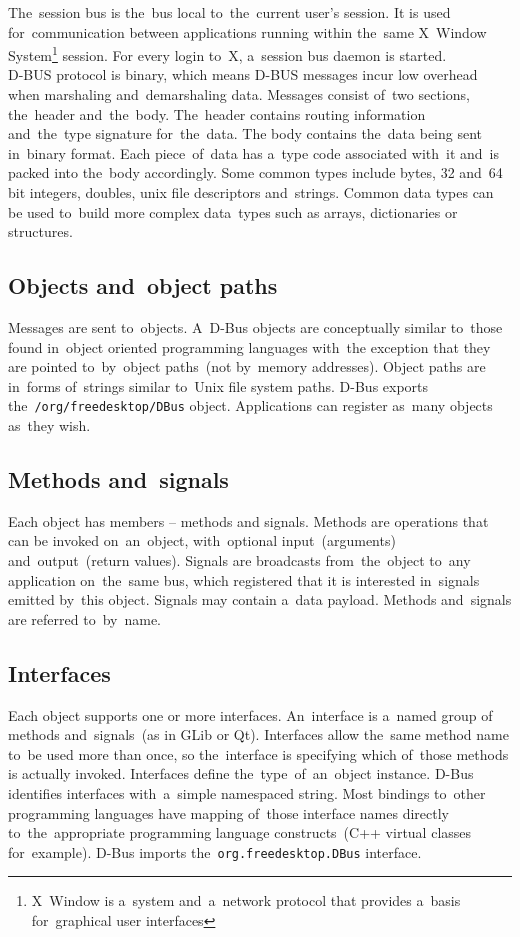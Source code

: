The~session bus is the~bus local to~the~current user's session. It is used
for~communication between applications running within the~same X~Window System\footnote{X~Window is a~system and~a~network protocol that provides a~basis
for~graphical user interfaces} session. For every login to~X, a~session bus
daemon is started.\\

D-BUS protocol is binary, which means D-BUS messages incur low overhead when
marshaling and~demarshaling data. Messages consist of~two sections, the~header
and~the~body. The~header contains routing information and~the~type signature
for~the~data. The body contains the~data being sent in~binary format. Each
piece~of~data has a~type code \mbox{associated} with~it and~is packed into the~body
accordingly. Some common types include bytes, 32 and~64 bit integers, doubles,
unix file descriptors and~strings. Common data types can be used to~build more
complex data~types such as arrays, dictionaries or structures.

\subsection{Objects and~object paths}
Messages are sent to~objects. A~D-Bus objects are conceptually similar to~those
found in~object oriented programming languages with~the exception that they are
pointed to~by~object paths~(not by~memory addresses). Object paths are in~forms
of~strings similar to~Unix file system paths. D-Bus exports
the~\texttt{/org/freedesktop/DBus} object. Applications can register as~many
objects as~they wish.

\subsection{Methods and~signals}
Each object has members -- methods and signals. Methods are operations that can
be invoked on~an~object, with~optional input~(arguments) and~output~(return values).
Signals are broadcasts from~the~object to~any application on~the~same bus, which
registered that it is interested in~signals emitted by~this object. Signals may
contain a~data payload. Methods and~signals are referred to~by~name.

\subsection{Interfaces}
Each object supports one or more interfaces. An~interface is a~named group
of methods and~signals~(as in GLib or Qt). Interfaces allow the~same method name
to~be used more than once, so the~interface is specifying which of~those methods
is actually invoked. Interfaces define the~type~of~an~object instance. D-Bus
identifies interfaces with~a~simple namespaced string.
Most bindings to~other programming languages have mapping of~those interface names
directly to~the~appropriate programming language constructs~(C++ virtual classes
for~example). D-Bus imports the~\texttt{org.freedesktop.DBus} interface.

